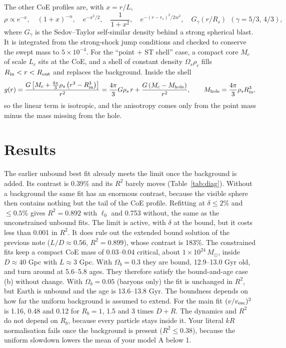 \documentclass[10pt,letterpaper]{article}
\begin{document}
The other CoE profiles are, with $x=r/L$,
\begin{equation}\label{eq:profiles}
\rho\propto e^{-x},\quad (1+x)^{-n},\quad e^{-x^2/2},\quad \frac{1}{1+x^2},\quad e^{-(r-r_s)^2/2w^2},\quad G_\gamma(r/R_s)\ \ (\gamma=5/3,\,4/3),
\end{equation}
where $G_\gamma$ is the Sedov--Taylor self-similar density behind a strong spherical blast. It is integrated from the strong-shock jump conditions and checked to conserve the swept mass to $5\times10^{-4}$. For the ``point + ST shell'' case, a compact core $M_c$ of scale $L_c$ sits at the CoE, and a shell of constant density $\Omega_s\rho_c$ fills $R_{\rm in}<r<R_{\rm out}$ and replaces the background. Inside the shell
\begin{equation}\label{eq:ptshell}
g(r)=\frac{G\left[M_c+\tfrac{4\pi}{3}\rho_s\left(r^3-R_{\rm in}^3\right)\right]}{r^2}=\frac{4\pi}{3}G\rho_s\,r+\frac{G\left(M_c-M_{\rm hole}\right)}{r^2},\qquad M_{\rm hole}=\frac{4\pi}{3}\rho_sR_{\rm in}^3,
\end{equation}
so the linear term is isotropic, and the anisotropy comes only from the point mass minus the mass missing from the hole.

\section{Results}
The earlier unbound best fit already meets the limit once the background is added. Its contrast is 0.39\% and its $R^2$ barely moves (Table~\ref{tab:diag}). Without a background the same fit has an enormous contrast, because the visible sphere then contains nothing but the tail of the CoE profile. Refitting at $\delta\le2\%$ and $\le0.5\%$ gives $R^2=0.892$ with $\ell_0$ and 0.753 without, the same as the unconstrained unbound fits. The limit is active, with $\delta$ at the bound, but it costs less than 0.001 in $R^2$. It does rule out the extended bound solution of the previous note ($L/D\approx0.56$, $R^2=0.899$), whose contrast is 183\%. The constrained fits keep a compact CoE mass of 0.03--0.04 critical, about $1\times10^{24}\,M_\odot$, inside $D\approx40$ Gpc with $L\approx3$ Gpc. With $\Omega_b=0.3$ they are bound, 12.9--13.0 Gyr old, and turn around at 5.6--5.8 ages. They therefore satisfy the bound-and-age case (b) without change. With $\Omega_b=0.05$ (baryons only) the fit is unchanged in $R^2$, but Earth is unbound and the age is 13.6--13.8 Gyr. The boundness depends on how far the uniform background is assumed to extend. For the main fit $(v/v_{\rm esc})^2$ is 1.16, 0.48 and 0.12 for $R_b=1$, 1.5 and 3 times $D+R$. The dynamics and $R^2$ do not depend on $R_b$, because every particle stays inside it. Your literal $kR$ normalisation fails once the background is present ($R^2\le0.38$), because the uniform slowdown lowers the mean of your model A below 1.
\end{document}
